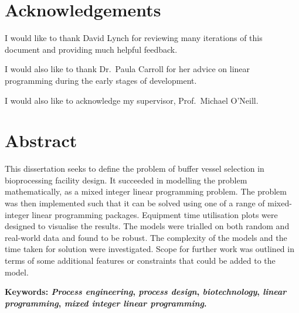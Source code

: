 \documentclass[a4paper,12pt,bibtotoc,oneside]{book} %
\numberwithin{equation}{section}
\numberwithin{figure}{chapter}
\begin{document}
\chapter*{Acknowledgements}
I would like to thank David Lynch for reviewing many iterations of this
document and providing much helpful feedback.

I would also like to thank Dr.\ Paula Carroll for her advice on linear
programming during the early stages of development.

I would also like to acknowledge my supervisor, Prof.\ Michael O'Neill.

\chapter*{Abstract} 
This dissertation seeks to define the problem of buffer vessel selection in
bioprocessing facility design.
It succeeded in modelling the problem mathematically, as a mixed integer linear
programming problem.
The problem was then implemented such that it can be solved using one of a
range of mixed-integer linear programming packages.
Equipment time utilisation plots were designed to visualise the results.
The models were trialled on both random and real-world data and found to be
robust.
The complexity of the models and the time taken for solution were investigated.
Scope for further work was outlined in terms of some additional features or
constraints that could be added to the model.

\vspace{1cm}
\textbf{Keywords: \emph{Process engineering},
    \emph{process design},
    \emph{biotechnology},
    \emph{linear programming},
    \emph{mixed integer linear programming}.}

 
\mainmatter 

\linespread{1.3} %









\backmatter
\end{document}
